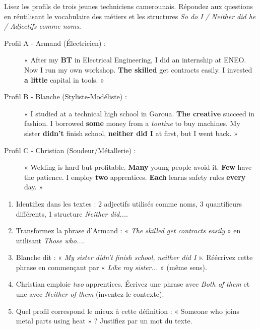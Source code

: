 \documentclass[11pt]{article}
\begin{document}
\begin{exercice}
Lisez les profils de trois jeunes techniciens camerounais. Répondez aux questions en réutilisant le vocabulaire des métiers et les structures \textit{So do I / Neither did he / Adjectifs comme noms}.

\begin{description}
    \item[Profil A - Armand (Électricien) :] « After my \textbf{BT} in Electrical Engineering, I did an internship at ENEO. Now I run my own workshop. \textbf{The skilled} get contracts easily. I invested \textbf{a little} capital in tools. »
    \item[Profil B - Blanche (Styliste-Modéliste) :] « I studied at a technical high school in Garoua. \textbf{The creative} succeed in fashion. I borrowed \textbf{some} money from a \textit{tontine} to buy machines. My sister \textbf{didn't} finish school, \textbf{neither did I} at first, but I went back. »
    \item[Profil C - Christian (Soudeur/Métallerie) :] « Welding is hard but profitable. \textbf{Many} young people avoid it. \textbf{Few} have the patience. I employ \textbf{two} apprentices. \textbf{Each} learns safety rules \textbf{every} day. »
\end{description}
\begin{enumerate}
    \item Identifiez dans les textes : 2 adjectifs utilisés comme noms, 3 quantifieurs différents, 1 structure \textit{Neither did...}.
    \item Transformez la phrase d'Armand : « \textit{The skilled get contracts easily} » en utilisant \textit{Those who...}.
    \item Blanche dit : « \textit{My sister didn't finish school, neither did I} ». Réécrivez cette phrase en commençant par « \textit{Like my sister...} » (même sens).
    \item Christian emploie \textit{two} apprentices. Écrivez une phrase avec \textit{Both of them} et une avec \textit{Neither of them} (inventez le contexte).
    \item Quel profil correspond le mieux à cette définition : « Someone who joins metal parts using heat » ? Justifiez par un mot du texte.
\end{enumerate}
\end{exercice}
\end{document}
